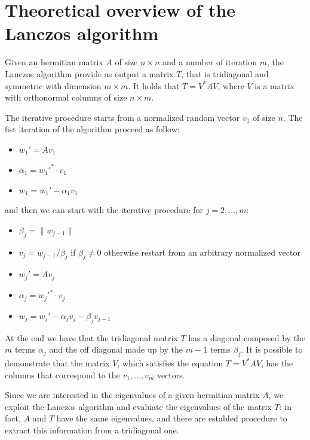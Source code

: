\documentclass[a4paper,11pt]{article}
\begin{document}
\section{Theoretical overview of the Lanczos algorithm}
\label{sec:Lanczos}

Given an hermitian matrix $A$ of size $n\times n$ and a number of iteration $m$, the Lanczos algorithm provide as output a matrix $T$, that is tridiagonal and symmetric with dimension $m \times m$. It holds that $T = V^*AV$, where $V$ is a matrix with orthonormal columns of size $n \times m$. 

The iterative procedure starts from a normalized random vector $v_1$ of size $n$. The fist iteration of the algorithm proceed as follow:
\begin{itemize}
    \item $w_1' = A v_1$
    \item $\alpha _1 = w_1'^* \cdot v_1$
    \item $w_1 = w_1' -\alpha _1 v_1$
\end{itemize}
and then we can start with the iterative procedure for $j=2,\dots ,m$:
\begin{itemize}
    \item $\beta _j = \| w_ {j-1}\|$
    \item $v_j = w_{j-1} / \beta _j $ if $\beta _j \neq 0$ otherwise restart from an arbitrary normalized vector
    \item $w_j ' = A v_j$
    \item $\alpha_j = w_j'^* \cdot v_j$
    \item $w_j = w_j' - \alpha _j v_j - \beta_j v_{j-1} $
\end{itemize}
%
At the end we have that the tridiagonal matrix $T$ has a diagonal composed by the $m$ terms $\alpha_j$ and the off diagonal made up by the $m-1$ terms $\beta_j$. It is possible to demonstrate that the matrix $V$, which satisfies the equation $T = V^*AV$, has the columns that correspond to the $v_1, \dots ,v_m$ vectors.

Since we are interested in the eigenvalues of a given hermitian matrix $A$, we exploit the Lanczos algorithm and evaluate the eigenvalues of the matrix $T$: in fact, $A$ and $T$ have the same eigenvalues, and there are establed procedure to extract this information from a tridiagonal one.

\end{document}

